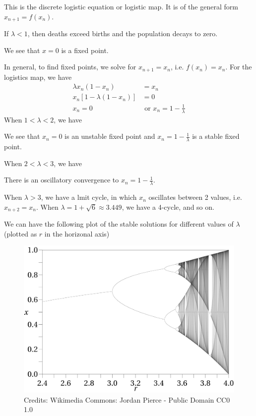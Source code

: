 \documentclass[a4paper]{article}
\begin{document}
This is the discrete logistic equation or logistic map. It is of the general form $x_{n + 1} = f(x_n)$.

If $\lambda  < 1$, then deaths exceed births and the population decays to zero.


We see that $x = 0$ is a fixed point.

In general, to find fixed points, we solve for $x_{n + 1} = x_n$, i.e. $f(x_n) = x_n$. For the logistics map, we have
\begin{align*}
  \lambda x_n(1 - x_n) &= x_n\\
  x_n[1 - \lambda(1 - x_n)] &= 0\\
  x_n = 0 &\text{ or } x_n = 1 - \frac{1}{\lambda}
\end{align*}
When $1 < \lambda < 2$, we have

\newpage %
We see that $x_n = 0$ is an unstable fixed point and $x_n = 1 - \frac{1}{\lambda}$ is a stable fixed point.

When $2 < \lambda < 3$, we have

There is an oscillatory convergence to $x_n = 1 - \frac{1}{\lambda}$.

When $\lambda > 3$, we have a lmit cycle, in which $x_n$ oscillates between 2 values, i.e. $x_{n + 2} = x_n$. When $\lambda = 1 + \sqrt{6} \approx 3.449$, we have a 4-cycle, and so on. 

\newpage
We can have the following plot of the stable solutions for different values of $\lambda$ (plotted as $r$ in the horizonal axis)

\begin{figure}[ht]
  \centering
  \includegraphics[width=330pt]{images/de_15.png}
  \caption*{Credits: Wikimedia Commons: Jordan Pierce - Public Domain CC0 1.0}
  
\end{figure}
\end{document}
